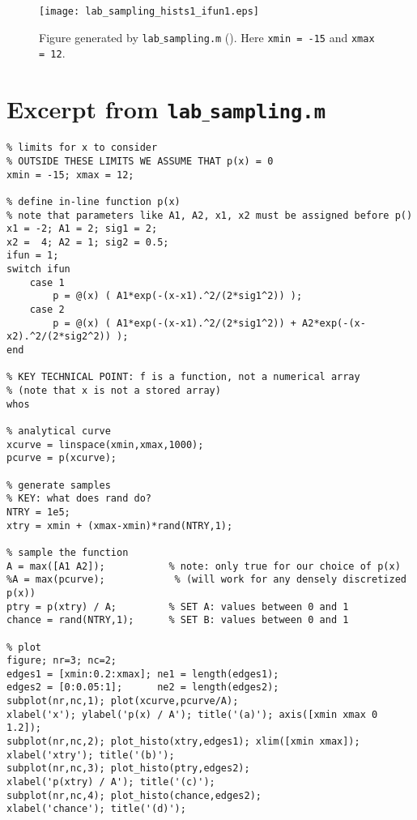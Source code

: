 \documentclass[11pt,titlepage,fleqn]{article}
\begin{document}

\begin{figure}
\centering
\texttt{[image: lab\_sampling\_hists1\_ifun1.eps]}
\caption[]
{{
Figure generated by {\tt lab$\_$sampling.m} ().
Here {\tt xmin = -15} and {\tt xmax = 12}.
\label{fig}
}}
\end{figure}


\clearpage\pagebreak
\appendix

\section{Excerpt from {\tt lab$\_$sampling.m}}
\label{sec:code}

\tiny
\begin{spacing}{1.0}
\begin{verbatim}
% limits for x to consider
% OUTSIDE THESE LIMITS WE ASSUME THAT p(x) = 0
xmin = -15; xmax = 12;

% define in-line function p(x)
% note that parameters like A1, A2, x1, x2 must be assigned before p()
x1 = -2; A1 = 2; sig1 = 2;
x2 =  4; A2 = 1; sig2 = 0.5;
ifun = 1;
switch ifun
    case 1
        p = @(x) ( A1*exp(-(x-x1).^2/(2*sig1^2)) );
    case 2
        p = @(x) ( A1*exp(-(x-x1).^2/(2*sig1^2)) + A2*exp(-(x-x2).^2/(2*sig2^2)) );
end

% KEY TECHNICAL POINT: f is a function, not a numerical array
% (note that x is not a stored array)
whos

% analytical curve
xcurve = linspace(xmin,xmax,1000);
pcurve = p(xcurve);

% generate samples
% KEY: what does rand do?
NTRY = 1e5;
xtry = xmin + (xmax-xmin)*rand(NTRY,1);

% sample the function
A = max([A1 A2]);           % note: only true for our choice of p(x)
%A = max(pcurve);            % (will work for any densely discretized p(x))
ptry = p(xtry) / A;         % SET A: values between 0 and 1
chance = rand(NTRY,1);      % SET B: values between 0 and 1

% plot
figure; nr=3; nc=2;
edges1 = [xmin:0.2:xmax]; ne1 = length(edges1);
edges2 = [0:0.05:1];      ne2 = length(edges2);
subplot(nr,nc,1); plot(xcurve,pcurve/A);
xlabel('x'); ylabel('p(x) / A'); title('(a)'); axis([xmin xmax 0 1.2]);
subplot(nr,nc,2); plot_histo(xtry,edges1); xlim([xmin xmax]);
xlabel('xtry'); title('(b)'); 
subplot(nr,nc,3); plot_histo(ptry,edges2);
xlabel('p(xtry) / A'); title('(c)'); 
subplot(nr,nc,4); plot_histo(chance,edges2);
xlabel('chance'); title('(d)'); 


\end{verbatim}
\end{spacing}
\end{document}
